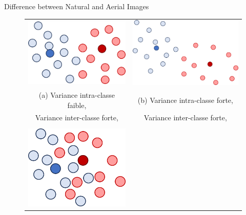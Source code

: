 \begin{subsectionframemod}{Difference between Natural and Aerial Images}
    \begin{figure}[!h]
    \centering
    \begin{tabular}{cc}
        \includegraphics[scale=0.25]{Figures/con_sep} &
        \includegraphics[scale=0.25]{Figures/ncon_sep} \\
        (a) Variance intra-classe faible, & (b) Variance intra-classe forte,\\
         Variance inter-classe forte, & Variance inter-classe forte, \\
         \\
        \includegraphics[scale=0.25]{Figures/con_nsep} &

\end{tabular}
\end{figure}
\end{subsectionframemod}
